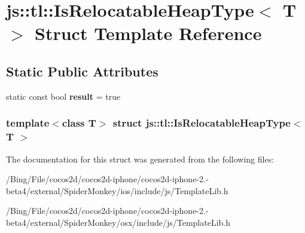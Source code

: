 \hypertarget{structjs_1_1tl_1_1_is_relocatable_heap_type}{\section{js\-:\-:tl\-:\-:Is\-Relocatable\-Heap\-Type$<$ T $>$ Struct Template Reference}
\label{structjs_1_1tl_1_1_is_relocatable_heap_type}
}
\subsection*{Static Public Attributes}
\begin{DoxyCompactItemize}
\item 
\hypertarget{structjs_1_1tl_1_1_is_relocatable_heap_type_af96d9b0b10473143bec9454d0be7d818}{static const bool {\bfseries result} = true}\label{structjs_1_1tl_1_1_is_relocatable_heap_type_af96d9b0b10473143bec9454d0be7d818}

\end{DoxyCompactItemize}
\subsubsection*{template$<$class T$>$ struct js\-::tl\-::\-Is\-Relocatable\-Heap\-Type$<$ T $>$}



The documentation for this struct was generated from the following files\-:\begin{DoxyCompactItemize}
\item 
/\-Bing/\-File/cocos2d/cocos2d-\/iphone/cocos2d-\/iphone-\/2.-\/beta4/external/\-Spider\-Monkey/ios/include/js/Template\-Lib.\-h\item 
/\-Bing/\-File/cocos2d/cocos2d-\/iphone/cocos2d-\/iphone-\/2.-\/beta4/external/\-Spider\-Monkey/osx/include/js/Template\-Lib.\-h\end{DoxyCompactItemize}
